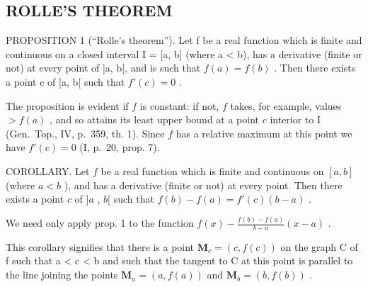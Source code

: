 \subsection{ROLLE'S THEOREM}

PROPOSITION 1 (``Rolle's theorem''). Let f be a real function which is finite and continuous on a closed interval I = {[}a, b{]} (where a \textless{} b), has a derivative (finite or not) at every point of {]}a, b{[}, and is such that \(f(a) = f(b)\) . Then there exists a point c of {]}a, b{[} such that \(f'(c) = 0\) .

The proposition is evident if \(f\) is constant: if not, \(f\) takes, for example, values \(> f(a)\) , and so attains its least upper bound at a point \(c\) interior to I (Gen.~Top., IV, p.~359, th. 1). Since \(f\) has a relative maximum at this point we have \(f'(c) = 0\) (I, p.~20, prop. 7).

COROLLARY. Let \(f\) be a real function which is finite and continuous on \([a, b]\) (where \(a < b\) ), and has a derivative (finite or not) at every point. Then there exists a point \(c\) of \(]a\) , \(b[\) such that \(f(b) - f(a) = f'(c)(b - a)\) .

We need only apply prop. 1 to the function \(f(x) - \frac{f(b) - f(a)}{b - a} (x - a)\) .

This corollary signifies that there is a point \(\mathbf{M}_{c} = (c, f(c))\) on the graph C of f such that a \textless{} c \textless{} b and such that the tangent to C at this point is parallel to the line joining the points \(\mathbf{M}_{a} = (a, f(a))\) and \(\mathbf{M}_{b} = (b, f(b))\) .

